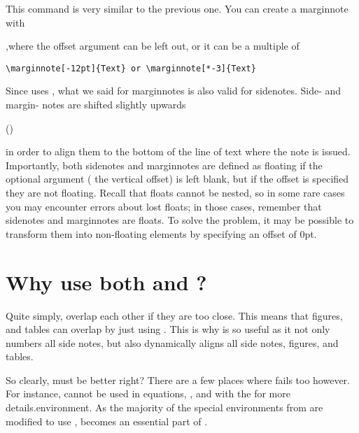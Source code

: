 This command is very similar to the previous one. You can create a 
marginnote with 


,where the offset 
argument can be left out, or it can be a multiple of 


\begin{lstlisting}
\marginnote[-12pt]{Text} or \marginnote[*-3]{Text}
\end{lstlisting}

Since  uses , 
what we said for marginnotes is also valid for sidenotes. Side- and 
margin- notes are shifted slightly upwards 

() 

in 
order to align them to the bottom of the line of text where the note is 
issued. Importantly, both sidenotes and marginnotes are defined as 
floating if the optional argument ( the vertical offset) is left 
blank, but if the offset is specified they are not floating. Recall that 
floats cannot be nested, so in some rare cases you may encounter errors 
about lost floats; in those cases, remember that sidenotes and 
marginnotes are floats. To solve the problem, it may be possible to 
transform them into non-floating elements by specifying an offset of 
0pt.

\section{Why use both  and ?}

Quite simply,  overlap each other if they are too close. This means that figures, and tables can overlap by just using . 
This is why  is so useful as it not only numbers all side notes, but also dynamically aligns all side notes, figures, and tables.

So clearly,  must be better right? 
There are a few places where  fails too however. 
For instance,  cannot be used in equations, , and with the  for more details.environment. 
As the majority of the special environments from  are modified to use ,  becomes an essential part of .


